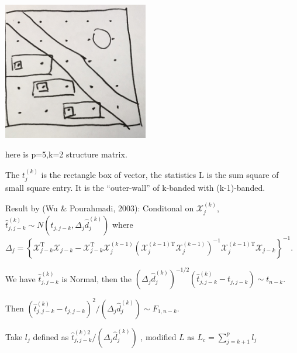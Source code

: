 \documentclass{beamer}
\begin{document}
\begin{frame}
\includegraphics[width=2.5in]{Band_test_structure.jpg}

here is p=5,k=2 structure matrix.

The \(t^{(k)}_j\) is the rectangle box of vector, the statistics L is
the sum square of small square entry. It is the ``outer-wall'' of
k-banded with (k-1)-banded.
\end{frame}

\begin{frame}

Result by (Wu \& Pourahmadi, 2003): Conditonal on
\(\mathcal X_j^{(k)}\),
\(\hat t_{j,j-k}^{(k)}\sim N(t_{j,j-k},\Delta_j\hat d_j^{(k)})\) where
\(\Delta _ { j } = \left\{ \mathcal { X } _ { j - k } ^ { \mathrm { T } } \mathcal { X } _ { j - k } - \mathcal { X } _ { j - k } ^ { \mathrm { T } } \mathcal { X } _ { j } ^ { ( k - 1 ) } \left( \mathcal { X } _ { j } ^ { ( k - 1 ) \mathrm { T } } \mathcal { X } _ { j } ^ { ( k - 1 ) } \right) ^ { - 1 } \mathcal { X } _ { j } ^ { ( k - 1 ) \mathrm { T } } \mathcal { X } _ { j - k } \right\} ^ { - 1 }\).

We have \(\hat t_{j,j-k}^{(k)}\) is Normal, then the
\(\left( \Delta _ { j } \hat { d } _ { j } ^ { ( k ) } \right) ^ { - 1 / 2 } \left( \hat { t } _ { j , j - k } ^ { ( k ) } - t _ { j , j - k } \right)\sim t_{n-k}\).

Then
\(\left( \hat { t } _ { j , j - k } ^ { ( k ) } - t _ { j , j - k } \right) ^ { 2 } / \left( \Delta _ { j } \hat { d } _ { j } ^ { ( k ) } \right)\sim F_{1,n-k}\).

Take \(l_j\) defined as
\(\hat { t } _ { j , j - k } ^ { ( k ) 2 } / \left( \Delta _ { j } \hat { d } _ { j } ^ { ( k ) } \right)\)
, modified \(L\) as
\(L _ { c } = \sum _ { j = k + 1 } ^ { p } l _ { j }\)
\end{frame}
\end{document}

